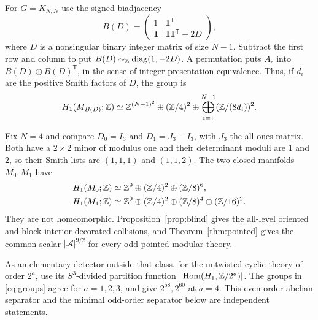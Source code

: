 For \(G=K_{N,N}\) use the signed biadjacency
\[
 B(D)=\begin{pmatrix}1&\mathbf1^{\mathsf T}\\
            \mathbf1&\mathbf1\mathbf1^{\mathsf T}-2D\end{pmatrix},
\]
where \(D\) is a nonsingular binary integer matrix of size \(N-1\).
Subtract the first row and column to put
\(B(D)\sim_{\mathbb Z}\operatorname{diag}(1,-2D)\). A permutation puts
\(A_\epsilon\) into \(B(D)\oplus B(D)^{\mathsf T}\), in the sense
of integer presentation equivalence. Thus, if \(d_i\) are the
positive Smith factors of \(D\), the group is
\[
 H_1(M_{B(D)};\mathbb Z)\simeq
 \mathbb Z^{(N-1)^2}\oplus(\mathbb Z/4)^2\oplus
 \bigoplus_{i=1}^{N-1}(\mathbb Z/(8d_i))^2 .
\]

Fix \(N=4\) and compare \(D_0=I_3\) and \(D_1=J_3-I_3\), with
\(J_3\) the all-ones matrix. Both have a \(2\times2\) minor of
modulus one and their determinant moduli are \(1\) and \(2\),
so their Smith lists are \((1,1,1)\) and \((1,1,2)\). The two
closed manifolds \(M_0,M_1\) have
\begin{align}
 H_1(M_0;\mathbb Z)&\simeq\mathbb Z^9\oplus(\mathbb Z/4)^2\oplus(\mathbb Z/8)^6,\notag\\
 H_1(M_1;\mathbb Z)&\simeq\mathbb Z^9\oplus(\mathbb Z/4)^2\oplus(\mathbb Z/8)^4
                                      \oplus(\mathbb Z/16)^2.\label{eq:groups}
\end{align}
They are not homeomorphic. Proposition~\ref{prop:blind} gives
the all-level oriented and block-interior decorated collisions,
and Theorem~\ref{thm:pointed} gives the common scalar
\(|\mathcal A|^{9/2}\) for every odd pointed modular theory.

As an elementary detector outside that class, for the untwisted
cyclic theory of order \(2^a\), use its \(S^3\)-divided partition
function \(|\operatorname{Hom}(H_1,\mathbb Z/2^a)|\). The groups in
\eqref{eq:groups} agree for \(a=1,2,3\), and give \(2^{58},2^{60}\)
at \(a=4\). This even-order abelian separator and the minimal
odd-order separator below are independent statements.
